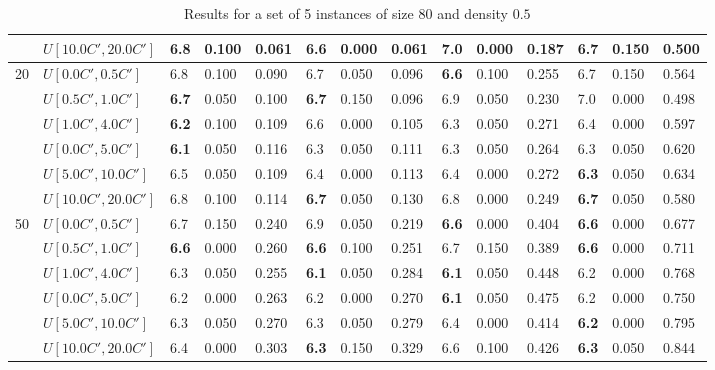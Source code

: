 \begin{table}[h]
{\begin{tabular}{|l|l||l|l|l||l|l|l||l|l|l||l|l|l|}
       & $U[10.0C',20.0C']$ & 6.8 & 0.100 & 0.061 & \textbf{6.6} & 0.000 & 0.061 & 7.0 & 0.000 & 0.187 & 6.7 & 0.150 & 0.500 \\
      \hline\hline
      \multirow{6}{*}{20} & $U[0.0C',0.5C']$ & 6.8 & 0.100 & 0.090 & 6.7 & 0.050 & 0.096 & \textbf{6.6} & 0.100 & 0.255 & 6.7 & 0.150 & 0.564 \\
       & $U[0.5C',1.0C']$ & \textbf{6.7} & 0.050 & 0.100 & \textbf{6.7} & 0.150 & 0.096 & 6.9 & 0.050 & 0.230 & 7.0 & 0.000 & 0.498 \\
       & $U[1.0C',4.0C']$ & \textbf{6.2} & 0.100 & 0.109 & 6.6 & 0.000 & 0.105 & 6.3 & 0.050 & 0.271 & 6.4 & 0.000 & 0.597 \\
       & $U[0.0C',5.0C']$ & \textbf{6.1} & 0.050 & 0.116 & 6.3 & 0.050 & 0.111 & 6.3 & 0.050 & 0.264 & 6.3 & 0.050 & 0.620 \\
       & $U[5.0C',10.0C']$ & 6.5 & 0.050 & 0.109 & 6.4 & 0.000 & 0.113 & 6.4 & 0.000 & 0.272 & \textbf{6.3} & 0.050 & 0.634 \\
       & $U[10.0C',20.0C']$ & 6.8 & 0.100 & 0.114 & \textbf{6.7} & 0.050 & 0.130 & 6.8 & 0.000 & 0.249 & \textbf{6.7} & 0.050 & 0.580 \\
      \hline\hline
      \multirow{6}{*}{50} & $U[0.0C',0.5C']$ & 6.7 & 0.150 & 0.240 & 6.9 & 0.050 & 0.219 & \textbf{6.6} & 0.000 & 0.404 & \textbf{6.6} & 0.000 & 0.677 \\
       & $U[0.5C',1.0C']$ & \textbf{6.6} & 0.000 & 0.260 & \textbf{6.6} & 0.100 & 0.251 & 6.7 & 0.150 & 0.389 & \textbf{6.6} & 0.000 & 0.711 \\
       & $U[1.0C',4.0C']$ & 6.3 & 0.050 & 0.255 & \textbf{6.1} & 0.050 & 0.284 & \textbf{6.1} & 0.050 & 0.448 & 6.2 & 0.000 & 0.768 \\
       & $U[0.0C',5.0C']$ & 6.2 & 0.000 & 0.263 & 6.2 & 0.000 & 0.270 & \textbf{6.1} & 0.050 & 0.475 & 6.2 & 0.000 & 0.750 \\
       & $U[5.0C',10.0C']$ & 6.3 & 0.050 & 0.270 & 6.3 & 0.050 & 0.279 & 6.4 & 0.000 & 0.414 & \textbf{6.2} & 0.000 & 0.795 \\
       & $U[10.0C',20.0C']$ & 6.4 & 0.000 & 0.303 & \textbf{6.3} & 0.150 & 0.329 & 6.6 & 0.100 & 0.426 & \textbf{6.3} & 0.050 & 0.844 \\
      \hline
      \end{tabular}
      }
      \caption{Results for a set of 5 instances of size $80$ and density $0.5$}
      \label{tab:pcpn80}\end{table}


